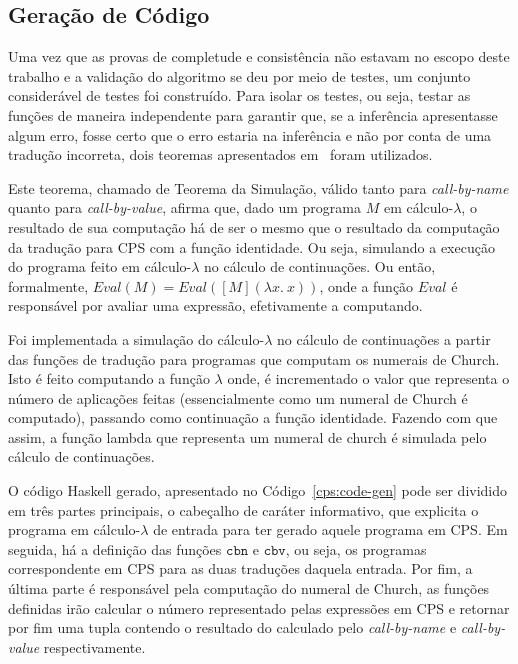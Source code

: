 \subsection{Geração de Código}\label{subsec:cps-code-gen}
Uma vez que as provas de completude e consistência não estavam no escopo deste trabalho e a validação do algoritmo se deu por meio de testes, um conjunto considerável de testes foi construído.
Para isolar os testes, ou seja, testar as funções de maneira independente para garantir que, se a inferência apresentasse algum erro, fosse certo que o erro estaria na inferência e não por conta de uma tradução incorreta, dois teoremas apresentados em~\cite{plotkin1975call} foram utilizados.

Este teorema, chamado de Teorema da Simulação, válido tanto para \textit{call-by-name} quanto para \textit{call-by-value}, afirma que, dado um programa $M$ em cálculo-$\lambda$, o resultado de sua computação há de ser o mesmo que o resultado da computação da tradução para CPS com a função identidade.
Ou seja, simulando a execução do programa feito em cálculo-$\lambda$ no cálculo de continuações.
Ou então, formalmente, $Eval(M) = Eval([M] (\lambda x.\ x))$, onde a função $Eval$ é responsável por avaliar uma expressão, efetivamente a computando.

Foi implementada a simulação do cálculo-$\lambda$ no cálculo de continuações a partir das funções de tradução para programas que computam os numerais de Church.
Isto é feito computando a função $\lambda$ onde, é incrementado o valor que representa o número de aplicações feitas (essencialmente como um numeral de Church é computado), passando como continuação a função identidade.
Fazendo com que assim, a função lambda que representa um numeral de church é simulada pelo cálculo de continuações.


O código Haskell gerado, apresentado no Código~\ref{cps:code-gen} pode ser dividido em três partes principais, o cabeçalho de caráter informativo, que explicita o programa em cálculo-$\lambda$ de entrada para ter gerado aquele programa em CPS.
Em seguida, há a definição das funções $\mathtt{cbn}$ e $\mathtt{cbv}$, ou seja, os programas correspondente em CPS para as duas traduções daquela entrada.
Por fim, a última parte é responsável pela computação do numeral de Church, as funções definidas irão calcular o número representado pelas expressões em CPS e retornar por fim uma tupla contendo o resultado do calculado pelo \textit{call-by-name} e \textit{call-by-value} respectivamente.

